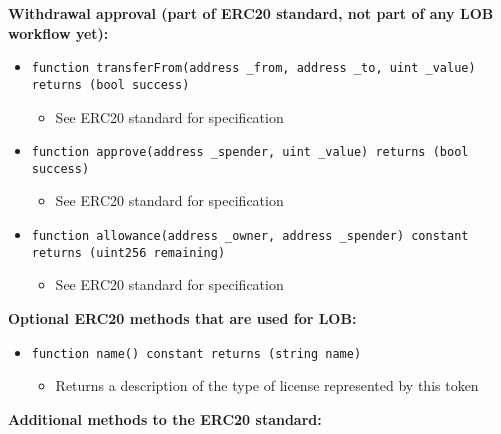 \documentclass[a4paper]{article}
\begin{document}
\textbf{Withdrawal approval (part of ERC20 standard, not part of any LOB workflow yet):}

\begin{itemize}
  \item \texttt{function transferFrom(address \_from, address \_to, uint \_value) returns (bool success)}
  \begin{itemize}
    \item See ERC20 standard for specification
  \end{itemize}
  
  \item \texttt{function approve(address \_spender, uint \_value) returns (bool success)}
  \begin{itemize}
    \item See ERC20 standard for specification
  \end{itemize}
  
  \item \texttt{function allowance(address \_owner, address \_spender) constant returns (uint256 remaining)}
  \begin{itemize}
    \item See ERC20 standard for specification
  \end{itemize}
\end{itemize}

\textbf{Optional ERC20 methods that are used for LOB:}

\begin{itemize}
  \item \texttt{function name() constant returns (string name)}
  \begin{itemize}
    \item Returns a description of the type of license represented by this token
  \end{itemize}
\end{itemize}

\textbf{Additional methods to the ERC20 standard:}
\end{document}
